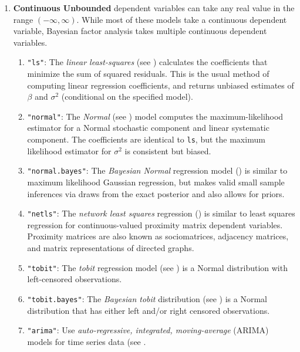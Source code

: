 \begin{enumerate}
\item {\bf Continuous Unbounded} dependent variables can take any
real value in the range $(-\infty, \infty)$. While most of these
models take a continuous dependent variable, Bayesian factor analysis takes multiple
continuous dependent variables.  

   \begin{enumerate}
   \item {\tt "ls"}: The {\it linear least-squares} (see )
     calculates the coefficients that minimize the sum of squared
     residuals.  This is the usual method of computing linear
     regression coefficients, and returns unbiased estimates of
     $\beta$ and $\sigma^2$ (conditional on the specified model).

   \item {\tt "normal"}: The {\it Normal} (see ) model
     computes the maximum-likelihood estimator for a Normal
     stochastic component and linear systematic component.  The
     coefficients are identical to \texttt{ls}, but the
     maximum likelihood estimator for $\sigma^2$ is consistent
     but biased.
   \item {\tt "normal.bayes"}:  The {\it Bayesian Normal} regression
model () is similar to maximum likelihood Gaussian
regression, but makes valid small sample inferences via draws from the
exact posterior and also allows for priors.  

   \item {\tt "netls"}: The {\it network least squares}
   regression () is similar to least squares regression
   for continuous-valued proximity matrix dependent variables.  Proximity
matrices are also known as sociomatrices, adjacency matrices, and
matrix representations of directed graphs.  

  \item {\tt "tobit"}:  The {\it tobit} regression model (see 
  ) is a Normal distribution with left-censored observations.

  \item {\tt "tobit.bayes"}: The {\it Bayesian tobit} distribution
  (see ) is a Normal distribution that has either
  left and/or right censored observations.  

  \item {\tt "arima"}: Use \emph{auto-regressive, integrated, moving-average}
  (ARIMA) models for time series data (see . 


\end{enumerate}
\end{enumerate}
